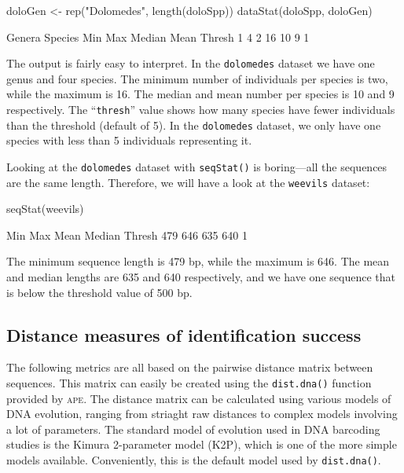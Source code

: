 \documentclass{article}
\newcommand{\progname}[1]{\textsc{#1}}
\newcommand{\fun}[1]{\texttt{#1}}
\begin{document}
\begin{console}
doloGen <- rep("Dolomedes", length(doloSpp))
dataStat(doloSpp, doloGen)
\end{console}

\begin{Routput}
 Genera Species     Min     Max  Median    Mean  Thresh 
      1       4       2      16      10       9       1 
\end{Routput}

The output is fairly easy to interpret. In the \fun{dolomedes} dataset we have one genus and four species. The minimum number of individuals per species is two, while the maximum is 16. The median and mean number per species is 10 and 9 respectively. The ``\fun{thresh}'' value shows how many species have fewer individuals than the threshold (default of 5). In the \fun{dolomedes} dataset, we only have one species with less than 5 individuals representing it.

Looking at the \fun{dolomedes} dataset with \fun{seqStat()} is boring---all the sequences are the same length. Therefore, we will have a look at the \fun{weevils} dataset:

\begin{console}
seqStat(weevils)
\end{console}

\begin{Routput}
   Min    Max   Mean Median Thresh 
   479    646    635    640      1
\end{Routput}

The minimum sequence length is 479 bp, while the maximum is 646. The mean and median lengths are 635 and 640 respectively, and we have one sequence that is below the threshold value of 500 bp.

\subsection{Distance measures of identification success}
The following metrics are all based on the pairwise distance matrix between sequences. This matrix can easily be created using the \fun{dist.dna()} function provided by \progname{ape}. The distance matrix can be calculated using various models of DNA evolution, ranging from striaght raw distances to complex models involving a lot of parameters. The standard model of evolution used in DNA barcoding studies is the Kimura 2-parameter model (K2P), which is one of the more simple models available. Conveniently, this is the default model used by \fun{dist.dna()}.
\end{document}
